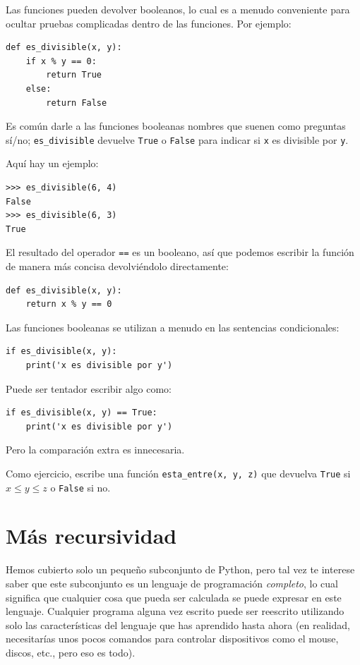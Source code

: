\documentclass[10pt]{book}
\begin{document}
Las funciones pueden devolver booleanos, lo cual es a menudo conveniente para ocultar
pruebas complicadas dentro de las funciones.  
Por ejemplo:

\begin{verbatim}
def es_divisible(x, y):
    if x % y == 0:
        return True
    else:
        return False
\end{verbatim}
%
Es común darle a las funciones booleanas nombres que suenen como preguntas
sí/no; \verb"es_divisible" devuelve {\tt True} o {\tt False}
para indicar si {\tt x} es divisible por {\tt y}.

Aquí hay un ejemplo:

\begin{verbatim}
>>> es_divisible(6, 4)
False
>>> es_divisible(6, 3)
True
\end{verbatim}
%
El resultado del operador {\tt ==} es un booleano, así que podemos escribir la
función de manera más concisa devolviéndolo directamente:

\begin{verbatim}
def es_divisible(x, y):
    return x % y == 0
\end{verbatim}
%
Las funciones booleanas se utilizan a menudo en las sentencias condicionales:

\begin{verbatim}
if es_divisible(x, y):
    print('x es divisible por y')
\end{verbatim}
%
Puede ser tentador escribir algo como:

\begin{verbatim}
if es_divisible(x, y) == True:
    print('x es divisible por y')
\end{verbatim}
%
Pero la comparación extra es innecesaria.

Como ejercicio, escribe una función \verb"esta_entre(x, y, z)" que
devuelva {\tt True} si $x \le y \le z$ o {\tt False} si no.


\section{Más recursividad}
\label{more.recursion}

Hemos cubierto solo un pequeño subconjunto de Python, pero tal vez
te interese saber que este subconjunto es un lenguaje de programación {\em completo},
lo cual significa que cualquier cosa que pueda ser
calculada se puede expresar en este lenguaje.  Cualquier programa alguna vez escrito
puede ser reescrito utilizando solo las características del lenguaje que has aprendido
hasta ahora (en realidad, necesitarías unos pocos comandos para controlar dispositivos
como el mouse, discos, etc., pero eso es todo).
\end{document}
